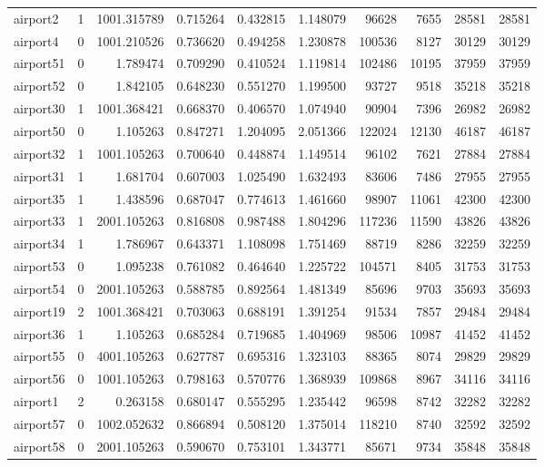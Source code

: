 \begin{longtable}{|l|r|r|r|r|r|r|r|r|r|}
airport2 & 1 & 1001.315789 & 0.715264 & 0.432815 & 1.148079 & 96628 & 7655 & 28581 & 28581 \\
airport4 & 0 & 1001.210526 & 0.736620 & 0.494258 & 1.230878 & 100536 & 8127 & 30129 & 30129 \\
airport51 & 0 & 1.789474 & 0.709290 & 0.410524 & 1.119814 & 102486 & 10195 & 37959 & 37959 \\
airport52 & 0 & 1.842105 & 0.648230 & 0.551270 & 1.199500 & 93727 & 9518 & 35218 & 35218 \\
airport30 & 1 & 1001.368421 & 0.668370 & 0.406570 & 1.074940 & 90904 & 7396 & 26982 & 26982 \\
airport50 & 0 & 1.105263 & 0.847271 & 1.204095 & 2.051366 & 122024 & 12130 & 46187 & 46187 \\
airport32 & 1 & 1001.105263 & 0.700640 & 0.448874 & 1.149514 & 96102 & 7621 & 27884 & 27884 \\
airport31 & 1 & 1.681704 & 0.607003 & 1.025490 & 1.632493 & 83606 & 7486 & 27955 & 27955 \\
airport35 & 1 & 1.438596 & 0.687047 & 0.774613 & 1.461660 & 98907 & 11061 & 42300 & 42300 \\
airport33 & 1 & 2001.105263 & 0.816808 & 0.987488 & 1.804296 & 117236 & 11590 & 43826 & 43826 \\
airport34 & 1 & 1.786967 & 0.643371 & 1.108098 & 1.751469 & 88719 & 8286 & 32259 & 32259 \\
airport53 & 0 & 1.095238 & 0.761082 & 0.464640 & 1.225722 & 104571 & 8405 & 31753 & 31753 \\
airport54 & 0 & 2001.105263 & 0.588785 & 0.892564 & 1.481349 & 85696 & 9703 & 35693 & 35693 \\
airport19 & 2 & 1001.368421 & 0.703063 & 0.688191 & 1.391254 & 91534 & 7857 & 29484 & 29484 \\
airport36 & 1 & 1.105263 & 0.685284 & 0.719685 & 1.404969 & 98506 & 10987 & 41452 & 41452 \\
airport55 & 0 & 4001.105263 & 0.627787 & 0.695316 & 1.323103 & 88365 & 8074 & 29829 & 29829 \\
airport56 & 0 & 1001.105263 & 0.798163 & 0.570776 & 1.368939 & 109868 & 8967 & 34116 & 34116 \\
airport1 & 2 & 0.263158 & 0.680147 & 0.555295 & 1.235442 & 96598 & 8742 & 32282 & 32282 \\
airport57 & 0 & 1002.052632 & 0.866894 & 0.508120 & 1.375014 & 118210 & 8740 & 32592 & 32592 \\
airport58 & 0 & 2001.105263 & 0.590670 & 0.753101 & 1.343771 & 85671 & 9734 & 35848 & 35848 \\

\end{longtable}
